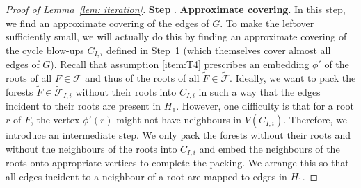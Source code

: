 \documentclass[a4paper, 11pt, reqno]{amsart}
\numberwithin{equation}{section}
\newcommand{\1}{{\rm 1\hspace*{-0.4ex}%
\rule{0.1ex}{1.52ex}\hspace*{0.2ex}}}
\newcommand{\cF}{\mathcal{F}}
\newcommand{\I}{I}
\newcounter{step}
\newcommand{\step}[1]{\bigskip\refstepcounter{step}\textbf{Step \thestep}. \textbf{#1}.}
\begin{document}
\begin{proof}[Proof of Lemma~\ref{lem: iteration}]
\step{Approximate covering}\label{step2}
In this step, we find an approximate covering of the edges of $G$. 
To make the leftover sufficiently small, we will actually do this by finding an approximate covering of the cycle blow-ups $C_{I,i}$ defined in Step~1 (which themselves cover almost all edges of $G$). 
Recall that assumption \ref{item:T4} prescribes an embedding $\phi'$ of the roots of all $F\in \cF$
and thus of the roots of all $\tilde{F}\in \tilde{\cF}$.
Ideally, we want to pack the forests $\tilde{F}\in \tilde{\cF}_{{\I},i}$ without their roots into $C_{{\I},i}$
in such a way that the edges incident to their roots are present in $H_1$.
However, one difficulty is that for a root $r$ of $F$, the vertex $\phi'(r)$ might not have neighbours in $V(C_{{\I},i})$.
Therefore, we introduce an intermediate step.
We only pack the forests without their roots and without the neighbours of the roots into $C_{{\I},i}$
and embed the neighbours of the roots onto appropriate vertices to complete the packing.
We arrange this so that all edges incident to a neighbour of a root are mapped to edges in $H_1$.


\end{proof}
\end{document}
